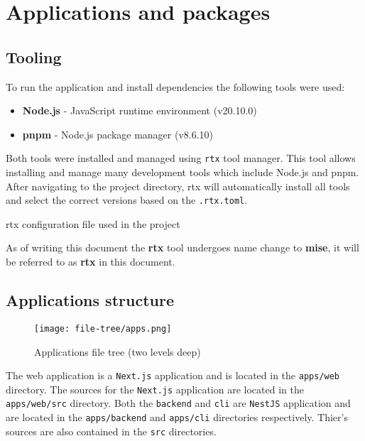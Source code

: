 \documentclass[../main.tex]{subfiles}
\begin{document}
\section{Applications and packages}

\subsection{Tooling}

To run the application and install dependencies the following tools were used:

\begin{itemize}
  \item \textbf{Node.js} \cite{nodejs} - JavaScript runtime environment (v20.10.0)
  \item \textbf{pnpm} \cite{pnpm} - Node.js package manager (v8.6.10)
\end{itemize}

Both tools were installed and managed using \texttt{rtx} \cite{rtx} tool manager.
This tool allows installing and manage many development tools which include Node.js and pnpm.
After navigating to the project directory, rtx will automatically install all tools and select the correct versions based on the \texttt{.rtx.toml}.

\begin{listing}[H]
  \caption{rtx configuration file used in the project}
\end{listing}

As of writing this document the \textbf{rtx} tool undergoes name change to \textbf{mise}, it will be referred to as \textbf{rtx} in this document.

\subsection{Applications structure}

\begin{figure}[H]
  \centering
  \texttt{[image: file-tree/apps.png]}
  \caption{Applications file tree (two levels deep)}
  \label{fig:apps-file-tree}
\end{figure}

The web application is a \texttt{Next.js} application and is located in the \texttt{apps/web} directory.
The sources for the \texttt{Next.js} application are located in the \texttt{apps/web/src} directory.
Both the \texttt{backend} and \texttt{cli} are \texttt{NestJS} application and are located in the \texttt{apps/backend} and \texttt{apps/cli} directories respectively.
Thier's sources are also contained in the \texttt{src} directories.
\end{document}
